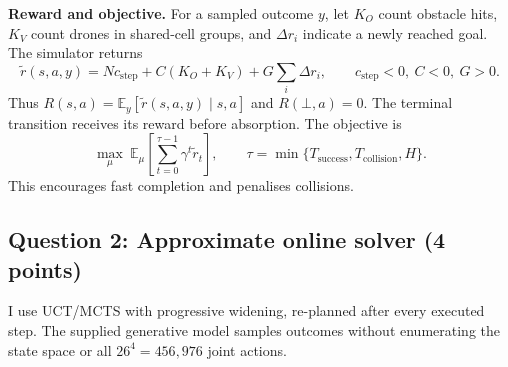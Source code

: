 \textbf{Reward and objective.} For a sampled outcome $y$, let $K_O$ count
obstacle hits, $K_V$ count drones in shared-cell groups, and $\Delta r_i$
indicate a newly reached goal. The simulator returns
\[
 \widetilde r(s,a,y)=Nc_{\mathrm{step}}+C(K_O+K_V)+G\sum_i\Delta r_i,
 \qquad c_{\mathrm{step}}<0,\ C<0,\ G>0.
\]
Thus $R(s,a)=\mathbb E_y[\widetilde r(s,a,y)\mid s,a]$ and $R(\bot,a)=0$.
The terminal transition receives its reward before absorption. The objective is
\[
 \max_\mu\ \mathbb E_\mu\!\left[
 \sum_{t=0}^{\tau-1}\gamma^t\widetilde r_t\right],
 \qquad \tau=\min\{T_{\mathrm{success}},T_{\mathrm{collision}},H\}.
\]
This encourages fast completion and penalises collisions.

\subsection*{Question 2: Approximate online solver (4 points)}
I use UCT/MCTS with progressive widening,
re-planned after every executed step. The supplied generative model samples
outcomes without enumerating the state space or all $26^4=456{,}976$ joint
actions.

